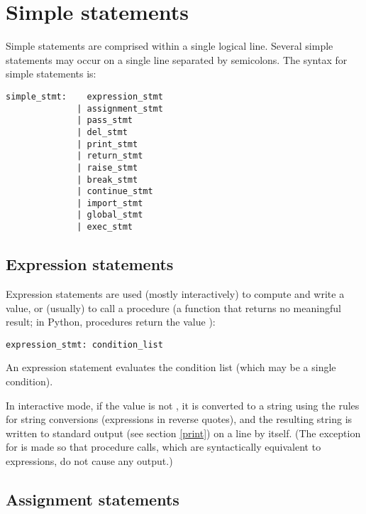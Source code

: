 \chapter{Simple statements}

Simple statements are comprised within a single logical line.
Several simple statements may occur on a single line separated
by semicolons.  The syntax for simple statements is:

\begin{verbatim}
simple_stmt:    expression_stmt
              | assignment_stmt
              | pass_stmt
              | del_stmt
              | print_stmt
              | return_stmt
              | raise_stmt
              | break_stmt
              | continue_stmt
              | import_stmt
              | global_stmt
              | exec_stmt
\end{verbatim}

\section{Expression statements}

Expression statements are used (mostly interactively) to compute and
write a value, or (usually) to call a procedure (a function that
returns no meaningful result; in Python, procedures return the value
):

\begin{verbatim}
expression_stmt: condition_list
\end{verbatim}

An expression statement evaluates the condition list (which may be a
single condition).

In interactive mode, if the value is not , it is converted
to a string using the rules for string conversions (expressions in
reverse quotes), and the resulting string is written to standard
output (see section \ref{print}) on a line by itself.
(The exception for  is made so that procedure calls, which
are syntactically equivalent to expressions, do not cause any output.)

\section{Assignment statements}

